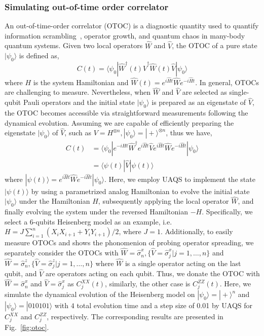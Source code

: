 \documentclass[twocolumn,
pra,aps,superscriptaddress,showpacs,amsmath,amssymb]{revtex4-2}
\begin{document}
\subsubsection{Simulating out-of-time order correlator}
An out-of-time-order correlator (OTOC) is a diagnostic quantity used to quantify information scrambling~\cite{fan2017out,swingle2018unscrambling,garttner2017measuring}, operator growth, and quantum chaos in many-body quantum systems. Given two local operators $\hat{W}$ and $\hat{V}$, the OTOC of a pure state $|\psi_0\rangle$ is defined as,
\begin{equation}
    C(t)=\langle\psi_0|\hat{W}^\dagger(t)\hat{V}^{\dagger}\hat{W}(t)\hat{V}|\psi_0\rangle
\end{equation}
where $H$ is the system Hamiltonian and $\hat{W}(t)=e^{i\hat{H}t}\hat{W}e^{-i\hat{H}t}$. 
In general, OTOCs are challenging to measure. Nevertheless, when $\hat{W}$ and $\hat{V}$ are selected as single-qubit Pauli operators and the initial state $|\psi_0\rangle$ is prepared as an eigenstate of $\hat{V}$, the OTOC becomes accessible via straightforward measurements following the dynamical evolution.
Assuming we are capable of efficiently preparing the eigenstate $|\psi_0\rangle$ of $\hat{V}$, such as $V=H^{\otimes n}, |\psi_0\rangle=|+\rangle^{\otimes n}$, thus we have,
\begin{align}
C(t)&=\langle\psi_0|e^{-i\hat{H}t}\hat{W}^\dagger e^{i\hat{H}t}\hat{V}e^{i\hat{H}t}\hat{W}e^{-i\hat{H}t}|\psi_0\rangle \nonumber \\
&=\langle\psi(t)|\hat{V}|\psi(t)\rangle
\end{align}
where $|\psi(t)\rangle=e^{i\hat{H}t}\hat{W}e^{-i\hat{H}t}|\psi_0\rangle$. 
Here, we employ UAQS to implement the state $ |\psi(t)\rangle$ by using a parametrized analog Hamiltonian to evolve the initial state $|\psi_0\rangle$ under the Hamiltonian $H$, subsequently applying the local operator $\hat{W}$, and finally evolving the system under the reversed Hamiltonian $-H$. Specifically, we select a 6-qubits Heisenberg model as an example, i.e. $H=J\sum_{i=1}^n(X_iX_{i+1}+Y_iY_{i+1})/2$, where $J=1$. Additionally, to easily measure OTOCs and shows the phonomenion of probing operator spreading, we separately consider the OTOCs with $\hat{W}=\hat{\sigma}_n^x, \{\hat{V}=\hat{\sigma}_j^x|j=1,\dots,n\}$ and $\hat{W}=\hat{\sigma}_n^z, \{\hat{V}=\hat{\sigma}_j^z|j=1,\dots,n\}$ where $\hat{W}$ is a single operator acting on the last qubit, and $\hat{V}$ are operators acting on each qubit. Thus, we donate the OTOC with $\hat{W}=\hat{\sigma}^x_n$ and $\hat{V}=\hat{\sigma}_j^x$ as $C^{XX}_j(t)$, similarly, the other case is $C^{ZZ}_j(t)$. Here, we simulate the dynamical evolution of the Heisenberg model on $|\psi_0\rangle=|+\rangle^n$ and $|\psi_0\rangle=|010101\rangle$ with $4$ total evolution time and a step size of 0.01 by UAQS for $C_j^{XX}$ and $C_j^{ZZ}$, respectively. The corresponding results are presented in Fig.~\ref{fig:otoc}. 
\end{document}
